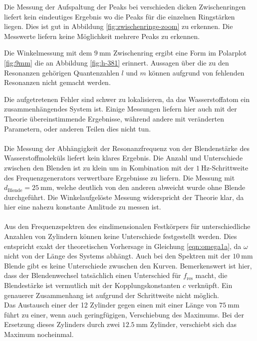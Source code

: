 Die Messung der Aufspaltung der Peaks bei verschieden dicken Zwischenringen liefert kein
eindeutiges Ergebnis wo die Peaks für die einzelnen Ringstärken liegen.
Dies ist gut in Abbildung \ref{fig:zwischenringe-zoom} zu erkennen.
Die Messwerte liefern keine Möglichkeit mehrere Peaks zu erkennen.

Die Winkelmessung mit dem $\SI{9}{\milli\meter}$ Zwischenring ergibt eine Form im Polarplot
\ref{fig:9mm} die an Abbildung \ref{fig:h-381} erinnert.
Aussagen über die zu den Resonanzen gehörigen Quantenzahlen $l$ und $m$ können aufgrund von
fehlenden Resonanzen nicht gemacht werden.

Die aufgetretenen Fehler sind schwer zu lokalisieren, da das Wasserstoffatom ein
zusammenhängendes System ist.
Einige Messungen liefern hier auch mit der Theorie übereinstimmende Ergebnisse,
während andere mit veränderten Parametern, oder anderen Teilen dies nicht tun.
\\~\\
Die Messung der Abhängigkeit der Resonanzfrequenz von der Blendenstärke des
Wasserstoffmoleküls liefert kein klares Ergebnis.
Die Anzahl und Unterschiede zwischen den Blenden ist zu klein um in
Kombination mit der $\SI{1}{\hertz}$-Schrittweite des Frequenzgenerators
verwertbare Ergebnisse zu liefern.
Die Messung mit $d_\text{Blende} = \SI{25}{\milli\meter}$, welche deutlich
von den anderen abweicht wurde ohne Blende durchgeführt.
Die Winkelaufgelöste Messung widerspricht der Theorie klar, da hier eine
nahezu konstante Amlitude zu messen ist.
\\~\\
Aus den Frequenzspektren des eindimensionalen Festkörpers für unterschiedliche Anzahlen von Zylindern können keine Unterschiede festgestellt werden.
Dies entspricht exakt der theoretischen Vorhersage in Gleichung \eqref{eqn:omega1a}, da $ω$ nicht von der Länge des Systems abhängt.
Auch bei den Spektren mit der $\SI{10}{\milli\meter}$ Blende gibt es keine Unterschiede zwuschen den Kurven.
Bemerkenswert ist hier, dass der Blendenwechsel tatsächlich einen Unterschied für $f_\text{res}$ macht,
die Blendestärke ist vermutlich mit der Kopplungskonstanten $c$ verknüpft.
Ein genauerer Zusammenhang ist aufgrund der Schrittweite nicht möglich.
\\
Das Austausch einer der 12 Zylinder gegen einen mit einer Länge von $\SI{75}{\milli\meter}$
führt zu einer, wenn auch geringfügigen, Verschiebung des Maximums.
Bei der Ersetzung dieses Zylinders durch zwei $\SI{12.5}{\milli\meter}$ Zylinder,
verschiebt sich das Maximum nocheinmal.
